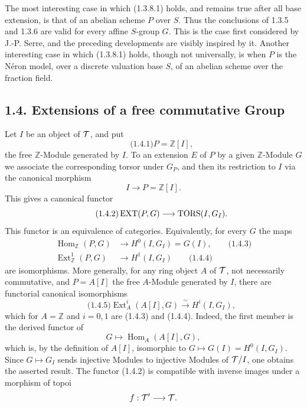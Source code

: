 \documentclass[11pt]{article}
\providecommand{\Z}{\mathbb Z}
\providecommand{\Hom}{\operatorname{Hom}}
\begin{document}
The most interesting case in which (1.3.8.1) holds, and remains true after all base extension, is that of an abelian scheme \(P\) over \(S\).  Thus the conclusions of 1.3.5 and 1.3.6 are valid for every affine \(S\)-group \(G\).  This is the case first considered by J.-P. Serre, and the preceding developments are visibly inspired by it.  Another interesting case in which (1.3.8.1) holds, though not universally, is when \(P\) is the Néron model, over a discrete valuation base \(S\), of an abelian scheme over the fraction field.

\subsection*{1.4. Extensions of a free commutative Group}

Let \(I\) be an object of \(\mathcal T\), and put
\begin{equation}\qquad\text{(1.4.1)}
  P=\Z[I],
\end{equation}
the free \(\Z\)-Module generated by \(I\).  To an extension \(E\) of \(P\) by a given \(\Z\)-Module \(G\) we associate the corresponding torsor under \(G_P\), and then its restriction to \(I\) via the canonical morphism
\[
  I\longrightarrow P=\Z[I].
\]
This gives a canonical functor
\begin{equation}\qquad\text{(1.4.2)}
  \operatorname{EXT}(P,G)\longrightarrow \operatorname{TORS}(I,G_I).
\end{equation}
This functor is an equivalence of categories.  Equivalently, for every \(G\) the maps
\begin{align}
  \Hom_{\Z}(P,G)&\longrightarrow H^0(I,G_I)=G(I), \qquad\text{(1.4.3)}\\
  \operatorname{Ext}^{1}_{\Z}(P,G)&\longrightarrow H^1(I,G_I) \qquad\text{(1.4.4)}
\end{align}
are isomorphisms.  More generally, for any ring object \(A\) of \(\mathcal T\), not necessarily commutative, and \(P=A[I]\) the free \(A\)-Module generated by \(I\), there are functorial canonical isomorphisms
\begin{equation}\qquad\text{(1.4.5)}
  \operatorname{Ext}^{i}_{A}(A[I],G)\xrightarrow{\sim}H^i(I,G_I),
\end{equation}
which for \(A=\Z\) and \(i=0,1\) are (1.4.3) and (1.4.4).  Indeed, the first member is the derived functor of
\[
  G\longmapsto\operatorname{Hom}_A(A[I],G),
\]
which is, by the definition of \(A[I]\), isomorphic to \(G\mapsto G(I)=H^0(I,G_I)\).  Since \(G\mapsto G_I\) sends injective Modules to injective Modules of \(\mathcal T/I\), one obtains the asserted result.  The functor (1.4.2) is compatible with inverse images under a morphism of topoi
\[
  f:\mathcal T'\longrightarrow\mathcal T.
\]
\end{document}
